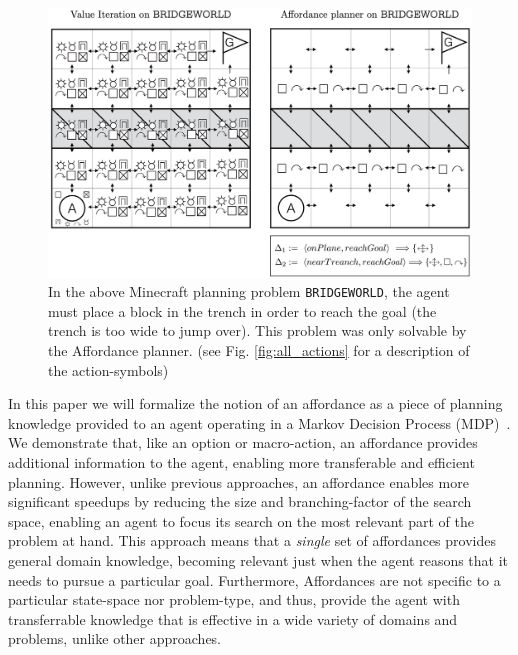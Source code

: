 \documentclass[]{article}
\begin{document}
\begin{figure}
\centering
\includegraphics[scale = 0.21]{figures/bridgeworld_vi_vs_aff.png}
\caption{In the above Minecraft planning problem \texttt{BRIDGEWORLD},
the agent must place a block in the trench in order to reach the goal 
(the trench is too wide to jump over). This problem was only solvable 
by the Affordance planner.\label{fig:bridgeworld_aff} (see Fig. \ref{fig:all_actions}
for a description of the action-symbols)}
\end{figure}

In this paper we will formalize
the notion of an affordance as a piece of planning knowledge provided
to an agent operating in a Markov Decision Process
(MDP)~\citep{kaelbling99}.  We demonstrate that, like an option or
macro-action, an affordance provides additional information to the
agent, enabling more transferable and efficient planning.  However, unlike previous
approaches, an affordance enables more significant speedups by
reducing the size and branching-factor of the search space, enabling
an agent to focus its search on the most relevant part of the problem
at hand.  This approach means that a {\em single} set of affordances
provides general domain knowledge, becoming relevant just when the
agent reasons that it needs to pursue a particular goal.  Furthermore,
Affordances are not specific to a particular state-space nor problem-type, and thus, provide
the agent with transferrable knowledge that is effective in a wide variety of
domains and problems, unlike other approaches.
\end{document}
